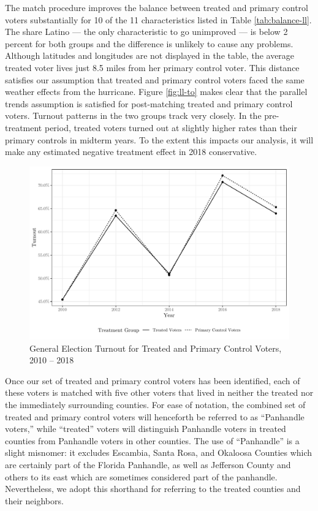 \documentclass[
  12pt,
]{article}
\begin{document}
The match procedure improves the balance between treated and primary control voters substantially for 10 of the 11 characteristics listed in Table \ref{tab:balance-ll}. The share Latino --- the only characteristic to go unimproved --- is below 2 percent for both groups and the difference is unlikely to cause any problems. Although latitudes and longitudes are not displayed in the table, the average treated voter lives just 8.5 miles from her primary control voter. This distance satisfies our assumption that treated and primary control voters faced the same weather effects from the hurricane. Figure \ref{fig:ll-to} makes clear that the parallel trends assumption is satisfied for post-matching treated and primary control voters. Turnout patterns in the two groups track very closely. In the pre-treatment period, treated voters turned out at slightly higher rates than their primary controls in midterm years. To the extent this impacts our analysis, it will make any estimated negative treatment effect in 2018 conservative.

\begin{figure}[H]

{\centering \includegraphics{hurricane_michael_files/figure-latex/ll-to-chunk-1} 

}

\caption{\label{fig:ll-to}General Election Turnout for Treated and Primary Control Voters, 2010 -- 2018}\label{fig:ll-to-chunk}
\end{figure}

Once our set of treated and primary control voters has been identified, each of these voters is matched with five other voters that lived in neither the treated nor the immediately surrounding counties. For ease of notation, the combined set of treated and primary control voters will henceforth be referred to as ``Panhandle voters,'' while ``treated'' voters will distinguish Panhandle voters in treated counties from Panhandle voters in other counties. The use of ``Panhandle'' is a slight misnomer: it excludes Escambia, Santa Rosa, and Okaloosa Counties which are certainly part of the Florida Panhandle, as well as Jefferson County and others to its east which are sometimes considered part of the panhandle. Nevertheless, we adopt this shorthand for referring to the treated counties and their neighbors.
\end{document}
